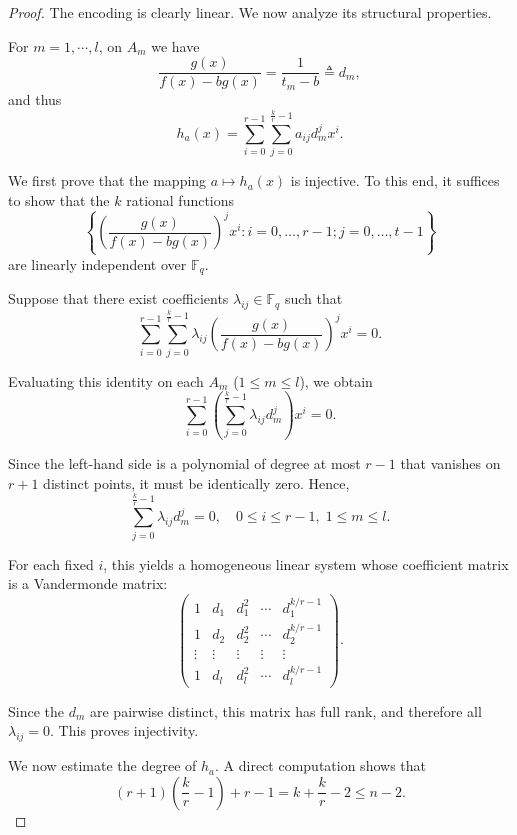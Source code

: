 \documentclass[1p,final]{elsarticle}
\newtheorem{open problem}[theorem]{Open Problem}
\begin{document}
\begin{proof}
The encoding is clearly linear. We now analyze its structural properties.

\medskip

For $m=1,\cdots,l$, on $A_{m}$ we have
\[
\frac{g(x)}{f(x)-b g(x)}=\frac{1}{t_{m}-b}\triangleq d_{m},
\]
and thus
\[
h_{a}(x)= \sum_{i=0}^{r-1} \sum_{j=0}^{\frac{k}{r}-1} a_{ij} d_{m}^j x^{i}.
\]

\medskip

We first prove that the mapping $a \mapsto  h_{a}(x)$ is injective. To this end, it suffices to show that the $k$ rational functions
\[
\left\{  \left( \frac{g(x)}{f(x)-b g(x)} \right)^{j}x^i: i=0,\ldots,r-1; j=0,\ldots,t-1 \right\}
\]
are linearly independent over $\mathbb{F}_q$.

Suppose that there exist coefficients $\lambda_{ij} \in \mathbb{F}_q$ such that
\[
\sum_{i=0}^{r-1} \sum_{j=0}^{\frac{k}{r}-1} \lambda_{ij} \left( \frac{g(x)}{f(x)-b g(x)} \right)^{j} x^{i}=0.
\]

Evaluating this identity on each $A_{m}$ ($1\le m\le l$), we obtain
\[
\sum_{i=0}^{r-1} \left(\sum_{j=0}^{\frac{k}{r}-1} \lambda_{ij} d_{m}^{j}\right) x^{i}=0.
\]

Since the left-hand side is a polynomial of degree at most $r-1$ that vanishes on $r+1$ distinct points, it must be identically zero. Hence,
\[
\sum_{j=0}^{\frac{k}{r}-1} \lambda_{ij} d_{m}^{j}=0, \quad 0\le i\le r-1,\; 1\le m\le l.
\]

For each fixed $i$, this yields a homogeneous linear system whose coefficient matrix is a Vandermonde matrix:
\[
 \begin{pmatrix}
	1 & d_1 & d_1^2 & \cdots & d_1^{k/r-1} \\
	1 & d_2 & d_2^2 & \cdots & d_2^{k/r-1} \\
	\vdots & \vdots & \vdots & \vdots & \vdots \\
	1 & d_l & d_l^2 & \cdots & d_l^{k/r-1}
\end{pmatrix}.
\]

Since the $d_m$ are pairwise distinct, this matrix has full rank, and therefore all $\lambda_{ij}=0$. This proves injectivity.

\medskip

We now estimate the degree of $h_{a}$. A direct computation shows that
\begin{equation}\label{degree}
(r+1)\left(\frac{k}{r}-1\right)+r-1=k+\frac{k}{r}-2\le n-2.
\end{equation}


\end{proof}
\end{document}

